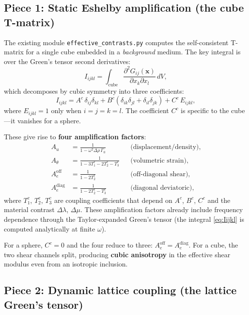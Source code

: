 \documentclass[11pt,a4paper]{article}
\newcommand{\D}{\Delta}
\begin{document}
\subsection{Piece 1: Static Eshelby amplification (the cube T-matrix)}

The existing module \texttt{effective\_contrasts.py} computes the
self-consistent T-matrix for a single cube embedded in a
\emph{background} medium.  The key integral is over the Green's tensor
second derivatives:
\begin{equation}\label{eq:Iijkl}
  I_{ijkl} = \int_{\text{cube}}
    \frac{\partial^2 G_{ij}(\bm{x})}{\partial x_k \partial x_l}\,dV,
\end{equation}
which decomposes by cubic symmetry into three coefficients:
\begin{equation}\label{eq:ABC}
  I_{ijkl} = A^c\,\delta_{ij}\delta_{kl}
            + B^c(\delta_{ik}\delta_{jl} + \delta_{il}\delta_{jk})
            + C^c\,E_{ijkl},
\end{equation}
where $E_{ijkl} = 1$ only when $i{=}j{=}k{=}l$.  The coefficient
$C^c$ is specific to the cube---it vanishes for a sphere.

These give rise to \textbf{four amplification factors}:
\begin{align}
  A_u &= \frac{1}{1 - \omega^2 \D\rho\,\Gamma_0}
    & &\text{(displacement/density),} \label{eq:amp_u}\\[4pt]
  A_\theta &= \frac{1}{1 - 3T_1^c - 2T_2^c - T_3^c}
    & &\text{(volumetric strain),} \label{eq:amp_theta}\\[4pt]
  A_e^{\text{off}} &= \frac{1}{1 - 2T_2^c}
    & &\text{(off-diagonal shear),} \label{eq:amp_eoff}\\[4pt]
  A_e^{\text{diag}} &= \frac{1}{1 - 2T_2^c - T_3^c}
    & &\text{(diagonal deviatoric),} \label{eq:amp_ediag}
\end{align}
where $T_1^c$, $T_2^c$, $T_3^c$ are coupling coefficients that depend
on $A^c$, $B^c$, $C^c$ and the material contrast $\D\lambda$, $\D\mu$.
These amplification factors already include
frequency dependence through the Taylor-expanded Green's tensor (the
integral \eqref{eq:Iijkl} is computed analytically at finite $\omega$).

For a sphere, $C^c = 0$ and the four reduce to three:
$A_e^{\text{off}} = A_e^{\text{diag}}$.  For a cube, the two shear
channels split, producing \textbf{cubic anisotropy} in the effective
shear modulus even from an isotropic inclusion.

\subsection{Piece 2: Dynamic lattice coupling (the lattice Green's tensor)}
\end{document}
